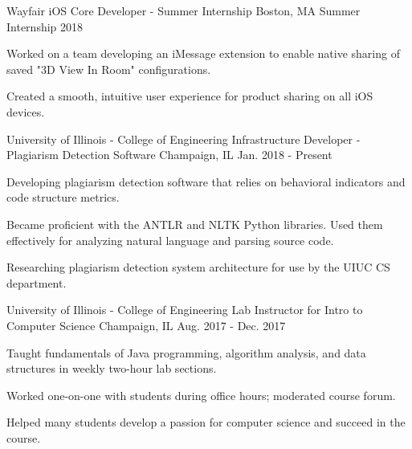 
\begin{cventries}
\cventry
{Wayfair} %
{iOS Core Developer - Summer Internship} %
{Boston, MA} %
{Summer Internship 2018} %
{
	\begin{cvitems} %
		\item {Worked on a team developing an iMessage extension to enable native sharing of saved "3D View In Room" configurations.}
		\item {Created a smooth, intuitive user experience for product sharing on all iOS devices.}
	\end{cvitems}
}
\cventry
{University of Illinois - College of Engineering} %
{Infrastructure Developer - Plagiarism Detection Software} %
{Champaign, IL} %
{Jan. 2018 - Present} %
{
    \begin{cvitems} %
        \item {Developing plagiarism detection software that relies on behavioral indicators and code structure metrics.}
        \item {Became proficient with the ANTLR and NLTK Python libraries. Used them effectively for analyzing natural language and parsing source code.}
        \item {Researching plagiarism detection system architecture for use by the UIUC CS department.}
    \end{cvitems}
}
\cventry
{University of Illinois - College of Engineering} %
{Lab Instructor for Intro to Computer Science} %
{Champaign, IL} %
{Aug. 2017 - Dec. 2017} %
{
	\begin{cvitems} %
		\item {Taught fundamentals of Java programming, algorithm analysis, and data structures in weekly two-hour lab sections.}
		\item {Worked one-on-one with students during office hours; moderated course forum.}
		\item {Helped many students develop a passion for computer science and succeed in the course.}
	\end{cvitems}
}
\end{cventries}
